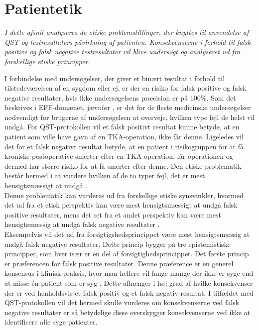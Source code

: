 \section{Patientetik}
\textit{I dette afsnit analyseres de etiske problemstillinger, der knyttes til anvendelse af QST og testresultaters påvirkning af patienten. Konsekvenserne i forhold til falsk positive og falsk negative testresultater vil blive undersøgt og analyseret ud fra forskellige etiske principper.}

I forbindelse med undersøgelser, der giver et binært resultat i forhold til tilstedeværelsen af en sygdom eller ej, er der en risiko for falsk positive og falsk negative resultater, hvis ikke undersøgelsens præcision er på 100\%. Som det beskrives i EFF-domænet, jævnfør , er det for de fleste medicinske undersøgelser nødvendigt for brugerne af undersøgelsen at overveje, hvilken type fejl de helst vil undgå. For QST-protokollen vil et falsk positivt resultat kunne betyde, at en patient som ville have gavn af en TKA-operation, ikke får denne. Ligeledes vil det for et falsk negativt resultat betyde, at en patient i risikogruppen for at få kroniske postoperative smerter efter en TKA-operation, får operationen og dermed har større risiko for at få smerter efter denne. Den etiske problematik består hermed i at vurdere hvilken af de to typer fejl, det er mest hensigtsmæssigt at undgå \citep{Kraemer2011}. \\
Denne problematik kan vurderes ud fra forskellige etiske synsvinkler, hvormed det ud fra et etisk perspektiv kan være mest hensigtsmæssigt at undgå falsk positive resultater, mens det set fra et andet perspektiv kan være mest hensigtsmæssig at undgå falsk negative resultater \citep{Kraemer2011}. \\
Eksempelvis vil det ud fra forsigtigshedsprincippet være mest hensigtsmæssig at undgå falsk negative resultater. Dette princip bygger på tre epistemistiske principper, som hver især er en del af forsigtighedsprincippet. \citep{Peterson2007} Det første princip er præferencen for falsk positive resultater. Denne præference er en generel konsensus i klinisk praksis, hvor man hellere vil fange mange der ikke er syge end at misse én patient som er syg \citep{Peterson2007}. Dette afhænger i høj grad af hvilke konsekvenser der er ved henholdsvis et falsk positiv og et falsk negativ resultat. I tilfældet med QST-protokollen vil det hermed skulle vurderes om konsekvenserne ved falsk negative resultater er så betydelige disse overskygger konsekvenserne ved ikke at identificere alle syge patienter. \citep{Peterson2007} \\
